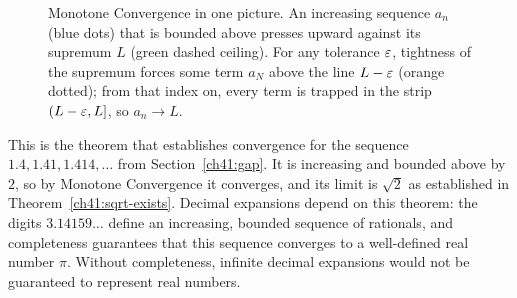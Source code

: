 \begin{figure}[H]
\centering
{}
\caption{Monotone Convergence in one picture. An increasing sequence $a_n$ (blue dots) that
is bounded above presses upward against its supremum $L$ (green dashed ceiling). For any
tolerance $\varepsilon$, tightness of the supremum forces some term $a_N$ above the line $L-\varepsilon$
(orange dotted); from that index on, every term is trapped in the strip $(L-\varepsilon,L]$, so
$a_n\to L$.}
\label{ch41:fig-mct}
\end{figure}

\begin{connectionbox}
This is the theorem that establishes convergence for the sequence $1.4, 1.41, 1.414,\ldots$ from
Section~\ref{ch41:gap}. It is increasing and bounded above by $2$, so by Monotone
Convergence it converges, and its limit is $\sqrt 2$ as established
in Theorem~\ref{ch41:sqrt-exists}. Decimal expansions depend
on this theorem: the digits $3.14159\ldots$ define an increasing,
bounded sequence of rationals, and completeness guarantees that this sequence
converges to a well-defined real number $\pi$. Without completeness, infinite
decimal expansions would not be guaranteed to represent real numbers.
\end{connectionbox}

